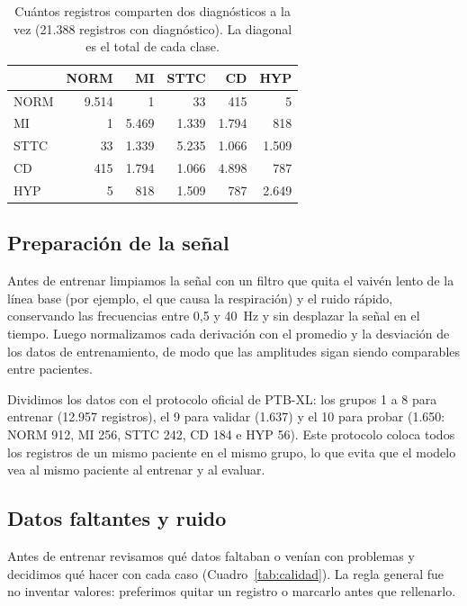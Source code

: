 \documentclass[conference]{IEEEtran}
\begin{document}
\begin{table}[t]
\centering
\caption{Cuántos registros comparten dos diagnósticos a la vez (21.388 registros con diagnóstico). La diagonal es el total de cada clase.}
\label{tab:cooc}
\small
\begin{tabular}{lrrrrr}
\toprule
 & NORM & MI & STTC & CD & HYP \\
\midrule
NORM & 9.514 & 1 & 33 & 415 & 5 \\
MI   & 1 & 5.469 & 1.339 & 1.794 & 818 \\
STTC & 33 & 1.339 & 5.235 & 1.066 & 1.509 \\
CD   & 415 & 1.794 & 1.066 & 4.898 & 787 \\
HYP  & 5 & 818 & 1.509 & 787 & 2.649 \\
\bottomrule
\end{tabular}
\end{table}

\subsection{Preparación de la señal}
Antes de entrenar limpiamos la señal con un filtro que quita el vaivén lento de la línea base (por ejemplo, el que causa la respiración) y el ruido rápido, conservando las frecuencias entre 0,5 y 40~Hz y sin desplazar la señal en el tiempo. Luego normalizamos cada derivación con el promedio y la desviación de los datos de entrenamiento, de modo que las amplitudes sigan siendo comparables entre pacientes.

Dividimos los datos con el protocolo oficial de PTB-XL: los grupos 1 a 8 para entrenar (12.957 registros), el 9 para validar (1.637) y el 10 para probar (1.650: NORM 912, MI 256, STTC 242, CD 184 e HYP 56). Este protocolo coloca todos los registros de un mismo paciente en el mismo grupo, lo que evita que el modelo vea al mismo paciente al entrenar y al evaluar.

\subsection{Datos faltantes y ruido}
Antes de entrenar revisamos qué datos faltaban o venían con problemas y decidimos qué hacer con cada caso (Cuadro~\ref{tab:calidad}). La regla general fue no inventar valores: preferimos quitar un registro o marcarlo antes que rellenarlo.
\end{document}
